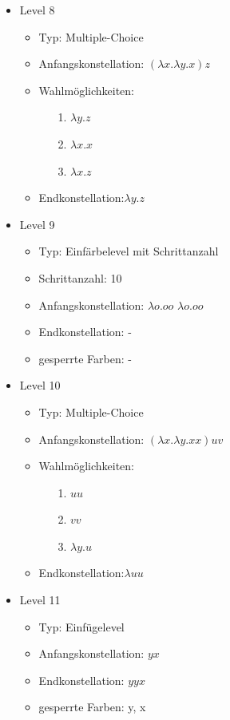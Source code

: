 \begin{itemize}
	\item{Level 8} 
		\begin{itemize}
			\item{Typ:} Multiple-Choice 
			\item{Anfangskonstellation:} \((\lambda x . \lambda y . x ) z\)    
			\item{Wahlmöglichkeiten:}  
				\begin{itemize}
					\item[1.] \( \lambda y . z\) 
					\item[2.] \( \lambda x . x \) 
					\item[3.] \( \lambda x . z\)
				\end{itemize}
			\item{Endkonstellation:}\( \lambda y . z\)
		\end{itemize}

	\item{Level 9} 
		\begin{itemize}
			\item{Typ:} Einfärbelevel mit Schrittanzahl
			\item{Schrittanzahl:} 10
			\item{Anfangskonstellation:} \(\lambda o . o o \)  \(\lambda o . o o \) 
			\item{Endkonstellation:}  -
			\item{gesperrte Farben:} -
		\end{itemize}

	\item{Level 10} 
		\begin{itemize}
			\item{Typ:} Multiple-Choice 
			\item{Anfangskonstellation:} \((\lambda x . \lambda y . x x ) u v\)    
			\item{Wahlmöglichkeiten:}  
				\begin{itemize}
					\item[1.] \( u u\) 
					\item[2.] \( v v \) 
					\item[3.] \( \lambda y . u\)
				\end{itemize}
			\item{Endkonstellation:}\( \lambda u u\)
		\end{itemize}
	
	\item{Level 11} 
		\begin{itemize}
			\item{Typ:} Einfügelevel
			\item{Anfangskonstellation:} \(y x \)    
			\item{Endkonstellation:} \(y y x\)
			\item{gesperrte Farben:} y, x 
		\end{itemize}


\end{itemize}
